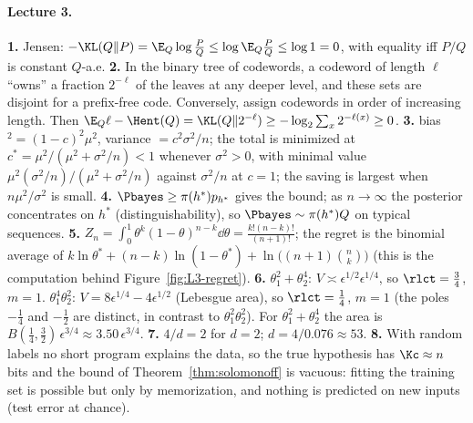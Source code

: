 \paragraph{Lecture 3.}
\textbf{1.} Jensen: $-\KL(Q\|P)=\E_Q\log\frac{P}{Q}\le\log\E_Q\frac PQ\le\log1=0$, with equality iff $P/Q$ is constant $Q$-a.e. \quad
\textbf{2.} In the binary tree of codewords, a codeword of length $\ell$ ``owns'' a fraction $2^{-\ell}$ of the leaves at any deeper level, and these sets are disjoint for a prefix-free code. Conversely, assign codewords in order of increasing length. Then $\E_Q\ell-\Hent(Q)=\KL(Q\|2^{-\ell})\ge-\log_2\sum_x2^{-\ell(x)}\ge0$. \quad
\textbf{3.} bias$^2=(1-c)^2\mu^2$, variance $=c^2\sigma^2/n$; the total is minimized at $c^*=\mu^2/(\mu^2+\sigma^2/n)<1$ whenever $\sigma^2>0$, with minimal value $\mu^2(\sigma^2/n)/(\mu^2+\sigma^2/n)$ against $\sigma^2/n$ at $c=1$; the saving is largest when $n\mu^2/\sigma^2$ is small. \quad
\textbf{4.} $\Pbayes\ge\pi(h^*)p_{h^*}$ gives the bound; as $n\to\infty$ the posterior concentrates on $h^*$ (distinguishability), so $\Pbayes\sim\pi(h^*)Q$ on typical sequences. \quad
\textbf{5.} $Z_n=\int_0^1\theta^k(1-\theta)^{n-k}\dd\theta=\frac{k!(n-k)!}{(n+1)!}$; the regret is the binomial average of $k\ln\theta^*+(n-k)\ln(1-\theta^*)+\ln\big((n+1)\binom nk\big)$ (this is the computation behind Figure~\ref{fig:L3-regret}). \quad
\textbf{6.} $\theta_1^2+\theta_2^4$: $V\asymp\epsilon^{1/2}\epsilon^{1/4}$, so $\rlct=\tfrac34$, $m=1$. $\theta_1^4\theta_2^2$: $V=8\epsilon^{1/4}-4\epsilon^{1/2}$ (Lebesgue area), so $\rlct=\tfrac14$, $m=1$ (the poles $-\tfrac14$ and $-\tfrac12$ are distinct, in contrast to $\theta_1^2\theta_2^2$). For $\theta_1^2+\theta_2^4$ the area is $B(\tfrac14,\tfrac32)\,\epsilon^{3/4}\approx3.50\,\epsilon^{3/4}$. \quad
\textbf{7.} $4/d=2$ for $d=2$; $d=4/0.076\approx53$. \quad
\textbf{8.} With random labels no short program explains the data, so the true hypothesis has $\Kc\approx n$ bits and the bound of Theorem~\ref{thm:solomonoff} is vacuous: fitting the training set is possible but only by memorization, and nothing is predicted on new inputs (test error at chance).
